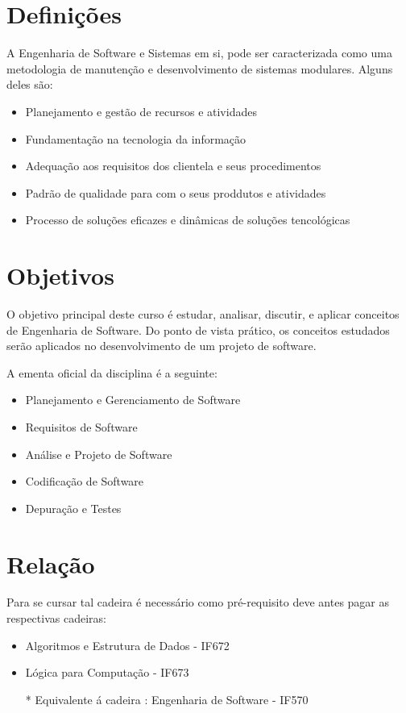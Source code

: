 \documentclass{article}
\begin{document}
  

\vspace{2 cm}


\section{Definições}
{ A Engenharia de Software e Sistemas em si, pode ser caracterizada como uma metodologia de manutenção e desenvolvimento de sistemas modulares. Alguns deles são:}\cite{rezende2006engenharia}
\begin{itemize}
    \item Planejamento e gestão de recursos e atividades
    \item Fundamentação na tecnologia da informação
    \item Adequação aos requisitos dos clientela e seus procedimentos 
    \item Padrão de qualidade para com o seus proddutos e atividades
    \item Processo de soluções eficazes e dinâmicas de soluções tencológicas
\end{itemize}

\vspace{2 cm}

\section{Objetivos}
{ O objetivo principal deste curso é estudar, analisar, discutir, e aplicar conceitos de Engenharia de Software. Do ponto de vista prático, os conceitos estudados serão aplicados no desenvolvimento de um projeto de software.}\cite{Objetivos}

{A ementa oficial da disciplina é a seguinte:}

\begin{itemize}
    \item Planejamento e Gerenciamento de Software
    \item Requisitos de Software
    \item Análise e Projeto de Software
    \item Codificação de Software
    \item Depuração e Testes
\end{itemize}

\vspace{2 cm}

\section{Relação}
{Para se cursar tal cadeira é necessário como pré-requisito deve antes pagar as respectivas cadeiras:}\cite{relacao}
\begin{itemize}
    \item Algoritmos e Estrutura de Dados - IF672
    \item Lógica para Computação - IF673
    \item[*] Equivalente á cadeira : Engenharia de Software - IF570
\end{itemize}
\end{document}
